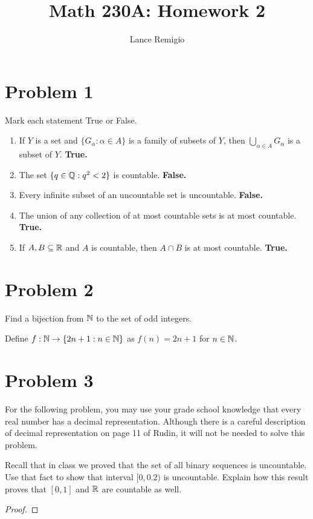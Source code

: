 \documentclass[11pt,a4paper]{article}
\title{Math 230A: Homework 2}
\author{Lance Remigio}
\begin{document}
\maketitle

\section*{Problem 1} Mark each statement True or False.

\begin{enumerate}
    \item If \( Y  \) is a set and \( \{ {G}_{\alpha} : \alpha \in A  \}   \) is a family of subsets of \( Y  \), then \( \bigcup_{ \alpha \in A  }^{  }  {G}_{\alpha} \) is a subset of \( Y  \). \textbf{True.}
    \item The set \( \{ q \in \mathbb{Q} : q^{2} < 2  \}  \) is countable. \textbf{False.}     
    \item Every infinite subset of an uncountable set is uncountable. \textbf{False.} 
    \item The union of any collection of at most countable sets is at most countable. \textbf{True.}
    \item If \( A,B \subseteq \mathbb{R}  \) and \( A  \) is countable, then \( A \cap B  \) is at most countable. \textbf{True.}
\end{enumerate}

\section*{Problem 2} Find a bijection from \( \mathbb{N}  \) to the set of odd integers.
\begin{solution}
Define \( f: \mathbb{N} \to \{ 2n + 1: n \in \mathbb{N} \}  \) as \( f(n) = 2n + 1  \) for \( n \in \mathbb{N} \). 
\end{solution}

\section*{Problem 3} For the following problem, you may use your grade school knowledge that every real number has a decimal representation. Although there is a careful description of decimal representation on page 11 of Rudin, it will not be needed to solve this problem. 


Recall that in class we proved that the set of all binary sequences is uncountable. Use that fact to show that interval \( [0,0.2) \) is uncountable. Explain how this result proves that \( [0,1] \) and \( \mathbb{R}  \) are countable as well.
\begin{proof}

\end{proof}
\end{document}
